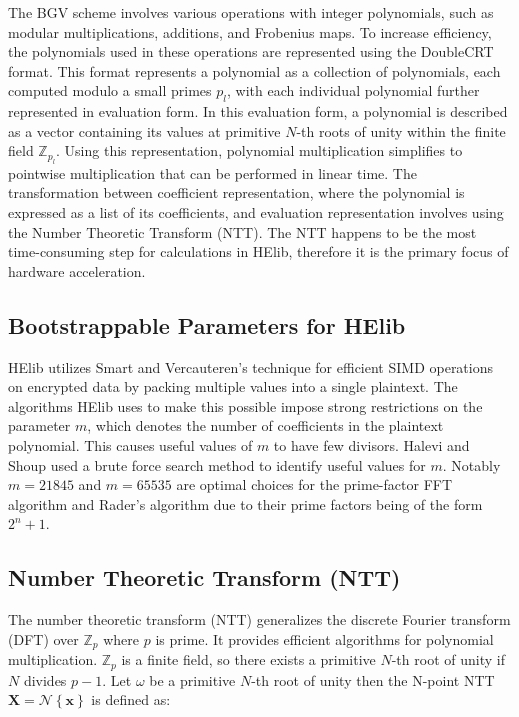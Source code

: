 \documentclass[lettersize,journal]{IEEEtran}
\begin{document}
The BGV scheme involves various operations with integer polynomials, such as modular multiplications, additions, and Frobenius maps. To increase efficiency, the polynomials used in these operations are represented using the DoubleCRT format. This format represents a polynomial as a collection of polynomials, each computed modulo a small primes $p_l$, with each individual polynomial further represented in evaluation form. In this evaluation form, a polynomial is described as a vector containing its values at primitive $N$-th roots of unity within the finite field $\mathbb{Z}_{p_l}$. Using this representation, polynomial multiplication simplifies to pointwise multiplication that can be performed in linear time. The transformation between coefficient representation, where the polynomial is expressed as a list of its coefficients, and evaluation representation involves using the Number Theoretic Transform (NTT). The NTT happens to be the most time-consuming step for calculations in HElib, therefore it is the primary focus of hardware acceleration.

\subsection{Bootstrappable Parameters for HElib}
HElib utilizes Smart and Vercauteren's technique\cite{FHEsimd} for efficient SIMD operations on encrypted data by packing multiple values into a single plaintext. The algorithms HElib uses to make this possible impose strong restrictions on the parameter $m$, which denotes the number of coefficients in the plaintext polynomial. This causes useful values of $m$ to have few divisors. Halevi and Shoup\cite{cryptoeprint:2014/873} used a brute force search method to identify useful values for $m$. Notably $m=21845$ and $m=65535$ are optimal choices for the prime-factor FFT algorithm and Rader's algorithm due to their prime factors being of the form $2^n + 1$.

\subsection{Number Theoretic Transform (NTT)}
The number theoretic transform (NTT) generalizes the discrete Fourier transform (DFT) over $\mathbb{Z}_p$ where $p$ is prime.
It provides efficient algorithms for polynomial multiplication. \cite{cryptoeprint:2016/504}
$\mathbb{Z}_p$ is a finite field, so there exists a primitive $N$-th root of unity if $N$ divides $p-1$.
Let $\omega$ be a primitive $N$-th root of unity then the N-point NTT $\mathbf{X}=\mathcal{N}\left\{\mathbf{x}\right\}$ is defined as:
\end{document}
